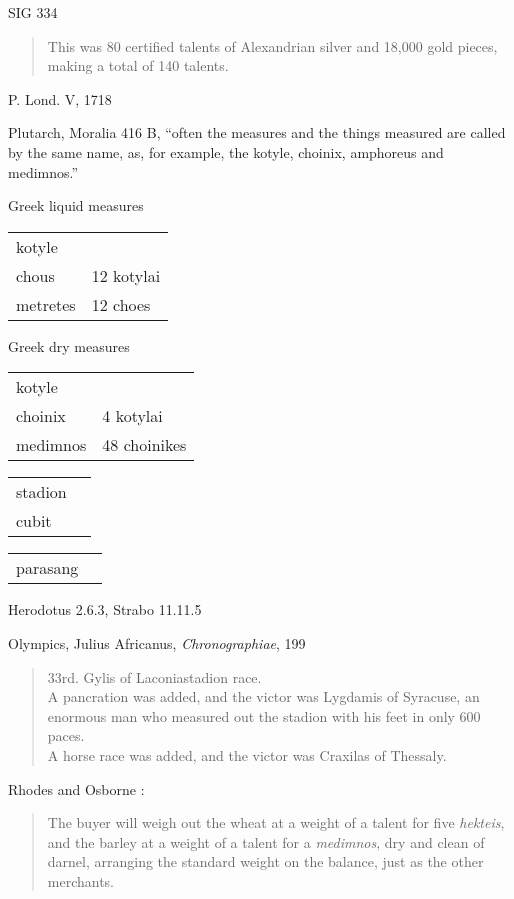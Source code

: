 \documentclass{article}
\begin{document}
SIG 334

\begin{quote}
This was 80 certified talents of Alexandrian silver and 18,000 gold pieces, making a total of 140 talents. 
\end{quote}


P. Lond. V, 1718 \cite[pp.~154--165]{PLondV}


Plutarch, Moralia 416 B, ``often the measures and the things measured are called by the same name,
as, for example, the kotyle, choinix, amphoreus and medimnos.''

Greek liquid measures

\begin{tabular}{ll}
kotyle&\\
chous&12 kotylai\\
metretes&12 choes
\end{tabular}

Greek dry measures

\begin{tabular}{ll}
kotyle&\\
choinix&4 kotylai\\
medimnos&48 choinikes
\end{tabular}

\begin{tabular}{ll}
stadion&\\
cubit&
\end{tabular}

\begin{tabular}{ll}
parasang&
\end{tabular}

Herodotus 2.6.3, Strabo 11.11.5

Olympics, Julius Africanus, {\em Chronographiae}, 199

\begin{quote}
33rd. Gylis of Laconia\qquad stadion race.\\
A pancration was added, and the victor was Lygdamis of Syracuse, an enormous
man who measured out the stadion with his feet in only 600 paces.\\
A horse race was added, and the victor was Craxilas of Thessaly.
\end{quote}

Rhodes and Osborne \cite[p.~121]{rhodes}:

\begin{quote}
The buyer will weigh out the wheat at a weight of a talent for five {\em hekteis}, and the barley at a weight of a talent for a {\em medimnos}, dry and clean of
darnel, arranging the standard weight on the balance, just as the other merchants.
\end{quote}
\end{document}
